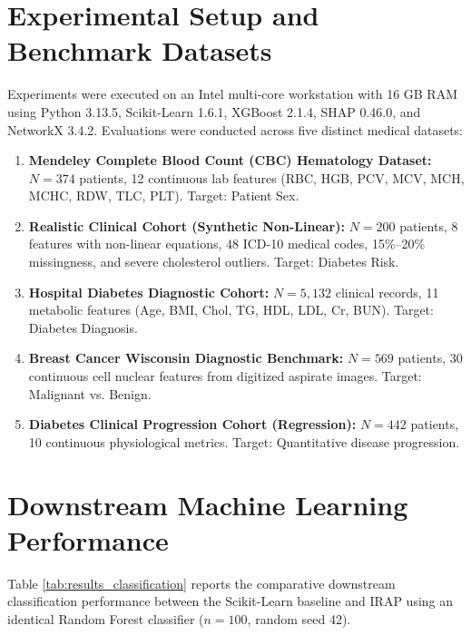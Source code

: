\documentclass[MTech]{ugthesis}
\begin{document}
\section{Experimental Setup and Benchmark Datasets}
Experiments were executed on an Intel multi-core workstation with 16 GB RAM using Python 3.13.5, Scikit-Learn 1.6.1, XGBoost 2.1.4, SHAP 0.46.0, and NetworkX 3.4.2. Evaluations were conducted across five distinct medical datasets:
\begin{enumerate}
    \item \textbf{Mendeley Complete Blood Count (\ac{CBC}) Hematology Dataset:} $N=374$ patients, 12 continuous lab features (RBC, HGB, PCV, MCV, MCH, MCHC, RDW, TLC, PLT). Target: Patient Sex.
    \item \textbf{Realistic Clinical Cohort (Synthetic Non-Linear):} $N=200$ patients, 8 features with non-linear equations, 48 ICD-10 medical codes, 15\%--20\% missingness, and severe cholesterol outliers. Target: Diabetes Risk.
    \item \textbf{Hospital Diabetes Diagnostic Cohort:} $N=5,132$ clinical records, 11 metabolic features (Age, BMI, Chol, TG, HDL, LDL, Cr, BUN). Target: Diabetes Diagnosis.
    \item \textbf{Breast Cancer Wisconsin Diagnostic Benchmark:} $N=569$ patients, 30 continuous cell nuclear features from digitized aspirate images. Target: Malignant vs. Benign.
    \item \textbf{Diabetes Clinical Progression Cohort (Regression):} $N=442$ patients, 10 continuous physiological metrics. Target: Quantitative disease progression.
\end{enumerate}

\section{Downstream Machine Learning Performance}
Table \ref{tab:results_classification} reports the comparative downstream classification performance between the Scikit-Learn baseline and \ac{IRAP} using an identical Random Forest classifier ($n=100$, random seed 42).
\end{document}
